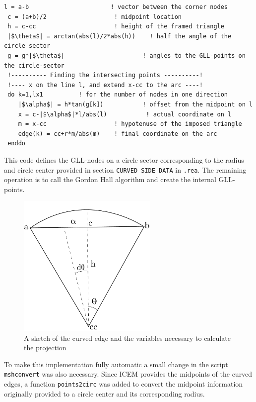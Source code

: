 \begingroup
\begin{lstlisting}[escapechar=|,frame=none]
 l = a-b                       ! vector between the corner nodes
 c = (a+b)/2                   ! midpoint location
 h = c-cc                      ! height of the framed triangle
 |$\theta$| = arctan(abs(l)/2*abs(h))    ! half the angle of the circle sector
 g = g*|$\theta$|                      ! angles to the GLL-points on the circle-sector
 !---------- Finding the intersecting points ----------!
 !---- x on the line l, and extend x-cc to the arc ----!
 do k=1,lx1          ! for the number of nodes in one direction
    |$\alpha$| = h*tan(g[k])           ! offset from the midpoint on l
    x = c-|$\alpha$|*l/abs(l)           ! actual coordinate on l
    m = x-cc                   ! hypotenuse of the imposed triangle
    edge(k) = cc+r*m/abs(m)    ! final coordinate on the arc
 enddo
\end{lstlisting}
\endgroup
This code defines the GLL-nodes on a circle sector corresponding to the radius and circle center
provided in section \verb|CURVED SIDE DATA| in \verb|.rea|.
The remaining operation is to call the Gordon Hall algorithm and create the internal GLL-points.
%
\begin{figure}[h]
    \centering
    \includegraphics[width = 0.6\textwidth]{Figures/curvature.pdf}
    \caption{A sketch of the curved edge and the variables necessary to calculate the projection}
    \label{fig:curvature}
\end{figure}
%
To make this implementation fully automatic a small change in the script \verb|mshconvert| was also necessary. 
Since ICEM provides the midpoints of the curved edges, a function \verb|points2circ| was added to convert the midpoint information 
originally provided to a circle center and its corresponding radius. 
